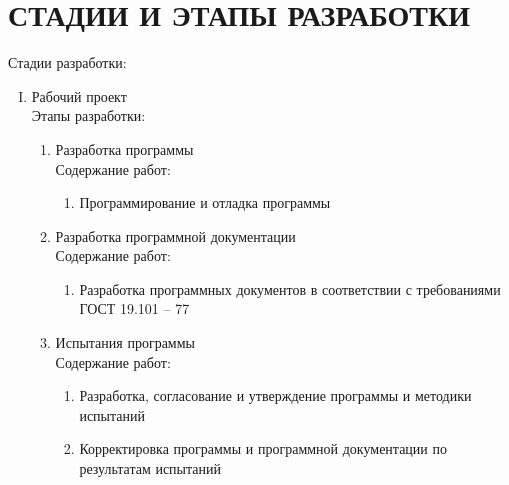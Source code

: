 \section{СТАДИИ И ЭТАПЫ РАЗРАБОТКИ}

Стадии разработки:
\begin{enumerate}[I.]
	\item Рабочий проект \\
	Этапы разработки:
	\begin{enumerate}[1.]
		\item Разработка программы \\
		Содержание работ:
		\begin{enumerate}[1)]
			\item Программирование и отладка программы
		\end{enumerate}
		
		\item Разработка программной документации \\
		Содержание работ:
		\begin{enumerate}[1)]
			\item Разработка программных документов в соответствии с требованиями ГОСТ 19.101 – 77
		\end{enumerate}
	
		\item Испытания программы \\
		Содержание работ:
		\begin{enumerate}[1)]
			\item Разработка, согласование и утверждение программы и методики испытаний
			\item Корректировка программы и программной документации по результатам испытаний
		\end{enumerate}
	\end{enumerate}
\end{enumerate}

\clearpage